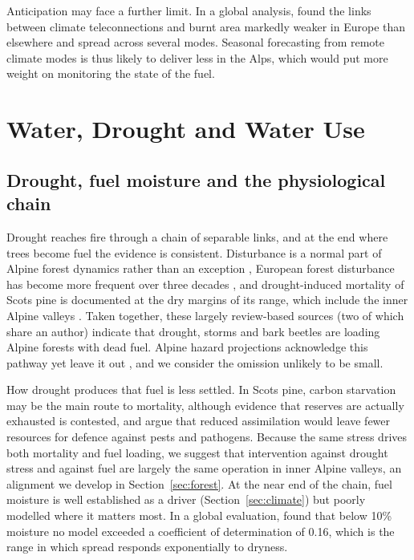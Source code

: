\documentclass[11pt,a4paper]{article}
\begin{document}
Anticipation may face a further limit. In a global analysis, \citet{cardil_climate_2023} found the links between climate teleconnections and burnt area markedly weaker in Europe than elsewhere and spread across several modes. Seasonal forecasting from remote climate modes is thus likely to deliver less in the Alps, which would put more weight on monitoring the state of the fuel.

\section{Water, Drought and Water Use}
\label{sec:water}

\subsection{Drought, fuel moisture and the physiological chain}

Drought reaches fire through a chain of separable links, and at the end where trees become fuel the evidence is consistent. Disturbance is a normal part of Alpine forest dynamics rather than an exception \citep{bebi_changes_2017}, European forest disturbance has become more frequent over three decades \citep{senf_mapping_2021}, and drought-induced mortality of Scots pine is documented at the dry margins of its range, which include the inner Alpine valleys \citep{giuggiola_droughtinduced_2010}. Taken together, these largely review-based sources (two of which share an author) indicate that drought, storms and bark beetles are loading Alpine forests with dead fuel. Alpine hazard projections acknowledge this pathway yet leave it out \citep{gerberding_mapping_2025}, and we consider the omission unlikely to be small.

How drought produces that fuel is less settled. In Scots pine, carbon starvation may be the main route to mortality, although evidence that reserves are actually exhausted is contested, and \citet{giuggiola_droughtinduced_2010} argue that reduced assimilation would leave fewer resources for defence against pests and pathogens. Because the same stress drives both mortality and fuel loading, we suggest that intervention against drought stress and against fuel are largely the same operation in inner Alpine valleys, an alignment we develop in Section~\ref{sec:forest}. At the near end of the chain, fuel moisture is well established as a driver (Section~\ref{sec:climate}) but poorly modelled where it matters most. In a global evaluation, \citet{rodrigues_vpdbased_2024} found that below 10\% moisture no model exceeded a coefficient of determination of 0.16, which is the range in which spread responds exponentially to dryness.
\end{document}
